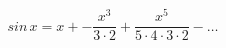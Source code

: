 \documentclass[12pt]{article}
\begin{document}
\sicpsize
\[
sin \, x = x + - \frac{x^3}{3 \cdot 2} + \frac{x^5}{5 \cdot 4 \cdot 3 \cdot 2} - \dots
\]
\end{document}
